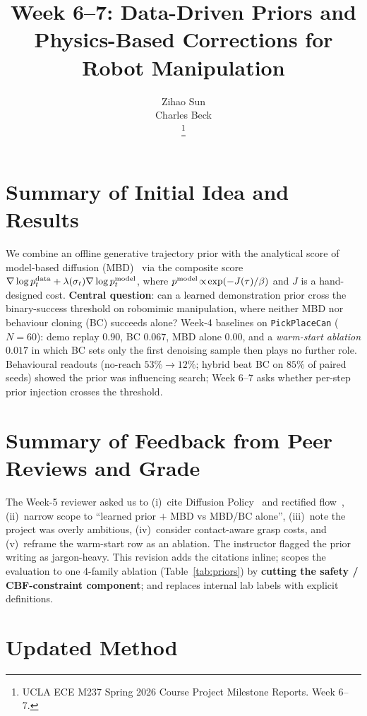 \documentclass[letterpaper, 10 pt, conference]{ieeeconf}
\title{\LARGE \bf
Week 6--7: Data-Driven Priors and Physics-Based Corrections
for Robot Manipulation}
\author{ \parbox{3 in}{\centering Zihao Sun}
        \hspace*{ 0.1 in}
        \parbox{2.5 in}{ \centering Charles Beck}
\thanks{UCLA ECE M237 Spring 2026 Course Project Milestone Reports.
Week 6--7.}
}
\begin{document}
\maketitle

\section{Summary of Initial Idea and Results}

We combine an offline generative trajectory prior with the
analytical score of model-based diffusion (MBD)~\cite{mbd}
via the composite score $\nabla\log p^{\rm data}_t
+\lambda(\sigma_t)\nabla\log p^{\rm model}_t$, where
$p^{\rm model}\!\propto\!\exp(-J(\tau)/\beta)$ and $J$ is a
hand-designed cost. \textbf{Central question}: can a learned
demonstration prior cross the binary-success threshold on
robomimic manipulation, where neither MBD nor behaviour
cloning (BC) succeeds alone? Week-4 baselines on
\texttt{PickPlaceCan} ($N\!=\!60$): demo replay $\mathbf{0.90}$,
BC $\mathbf{0.067}$, MBD alone $\mathbf{0.00}$, and a
\emph{warm-start ablation} $\mathbf{0.017}$ in which BC sets
only the first denoising sample then plays no further role.
Behavioural readouts (no-reach $53\%\!\to\!12\%$; hybrid beat
BC on $85\%$ of paired seeds) showed the prior was influencing
search; Week 6--7 asks whether per-step prior injection crosses
the threshold.

\section{Summary of Feedback from Peer Reviews and Grade}

The Week-5 reviewer asked us to (i)~cite Diffusion
Policy~\cite{dp} and rectified flow~\cite{rectflow},
(ii)~narrow scope to ``learned prior $+$ MBD vs MBD/BC alone'',
(iii)~note the project was overly ambitious, (iv)~consider
contact-aware grasp costs, and (v)~reframe the warm-start row
as an ablation. The instructor flagged the prior writing as
jargon-heavy. This revision adds the citations inline; scopes
the evaluation to one 4-family ablation (Table~\ref{tab:priors})
by \textbf{cutting the safety / CBF-constraint component}; and
replaces internal lab labels with explicit definitions.

\section{Updated Method}
\end{document}
